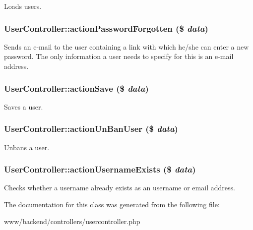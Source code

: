Loads users. \hypertarget{classUserController_a871a1c07ec9fc14a41a57d1e6268aa6d}{
\subsubsection[{actionPasswordForgotten}]{\setlength{\rightskip}{0pt plus 5cm}UserController::actionPasswordForgotten (\$ {\em data})}}
\label{classUserController_a871a1c07ec9fc14a41a57d1e6268aa6d}
Sends an e-\/mail to the user containing a link with which he/she can enter a new password. The only information a user needs to specify for this is an e-\/mail address. \hypertarget{classUserController_aa2eeb49ff1dbd448a986e97a72179fb5}{
\subsubsection[{actionSave}]{\setlength{\rightskip}{0pt plus 5cm}UserController::actionSave (\$ {\em data})}}
\label{classUserController_aa2eeb49ff1dbd448a986e97a72179fb5}
Saves a user. \hypertarget{classUserController_a4506a9975c5185621d76a163c514dbd9}{
\subsubsection[{actionUnBanUser}]{\setlength{\rightskip}{0pt plus 5cm}UserController::actionUnBanUser (\$ {\em data})}}
\label{classUserController_a4506a9975c5185621d76a163c514dbd9}
Unbans a user. \hypertarget{classUserController_a68423799af006a035af5f5a7dc466166}{
\subsubsection[{actionUsernameExists}]{\setlength{\rightskip}{0pt plus 5cm}UserController::actionUsernameExists (\$ {\em data})}}
\label{classUserController_a68423799af006a035af5f5a7dc466166}
Checks whether a username already exists as an username or email address. 

The documentation for this class was generated from the following file:\begin{DoxyCompactItemize}
\item 
www/backend/controllers/usercontroller.php\end{DoxyCompactItemize}
